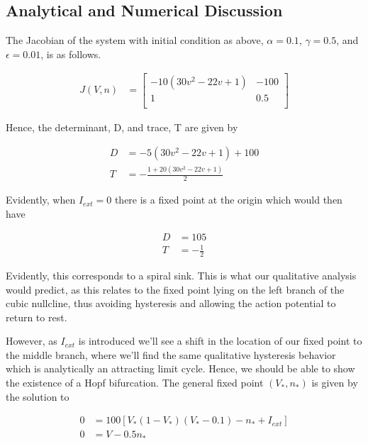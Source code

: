 \documentclass{article}
\begin{document}
\subsection{Analytical and Numerical Discussion}

The Jacobian of the system with initial condition as above, $\alpha = 0.1$, $\gamma = 0.5$, and $\epsilon = 0.01$, is as follows.

\begin{align*}
J(V,n) &= \begin{bmatrix}
    -10(30v^2-22v+1)     & -100 \\
    1      & 0.5 \\
\end{bmatrix}
\end{align*}

Hence, the determinant, D, and trace, T are given by

\begin{align*}
D &= -5(30v^2-22v+1)+100 \\
T &= -\frac{1+20(30v^2-22v+1)}{2}
\end{align*}

Evidently, when $I_{ext}=0$ there is a fixed point at the origin which would then have

\begin{align*}
D &= 105 \\
T &= -\frac{1}{2}
\end{align*}

Evidently, this corresponds to a spiral sink. This is what our qualitative analysis would predict, as this relates to the fixed point lying on the left branch of the cubic nullcline, thus avoiding hysteresis and allowing the action potential to return to rest.

However, as $I_{ext}$ is introduced we'll see a shift in the location of our fixed point to the middle branch, where we'll find the same qualitative hysteresis behavior which is analytically an attracting limit cycle. Hence, we should be able to show the existence of a Hopf bifurcation. The general fixed point $(V_*, n_*)$ is given by the solution to 

\begin{align*}
0 &= 100[V_*(1-V_*)(V_*-0.1)-n_* + I_{ext}]\\
0 &= V-0.5n_*
\end{align*}
\end{document}
